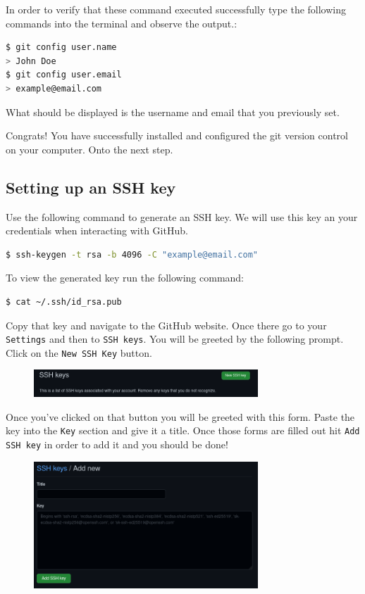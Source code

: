 \documentclass[a4paper,10pt]{article} %
\begin{document}
In order to verify that these command executed successfully type the following commands into the terminal and observe the output.:
\begin{lstlisting}[language=bash]
$ git config user.name
> John Doe
$ git config user.email
> example@email.com
\end{lstlisting}
What should be displayed is the username and email that you previously set.

Congrats! You have successfully installed and configured the git version control on your computer. Onto the next step.

\subsection{Setting up an SSH key}

Use the following command to generate an SSH key. We will use this key an your credentials when interacting with GitHub.
\begin{lstlisting}[language=bash]
$ ssh-keygen -t rsa -b 4096 -C "example@email.com"
\end{lstlisting}

To view the generated key run the following command:
\begin{lstlisting}[language=bash]
$ cat ~/.ssh/id_rsa.pub
\end{lstlisting}

Copy that key and navigate to the GitHub website. Once there go to your \lstinline|Settings| and then to \lstinline|SSH keys|. You will be greeted by the following prompt. Click on the \lstinline|New SSH Key| button.

\begin{figure}[H]
  \centering
  \includegraphics[width=0.75\textwidth]{./imgs/new_ssh.png}
\end{figure}

Once you've clicked on that button you will be greeted with this form. Paste the key into the \lstinline|Key| section and give it a title. Once those forms are filled out hit \lstinline|Add SSH key| in order to add it and you should be done!

\begin{figure}[H]
  \centering
  \includegraphics[width=0.75\textwidth]{./imgs/add_ssh.png}
\end{figure}
\end{document}
